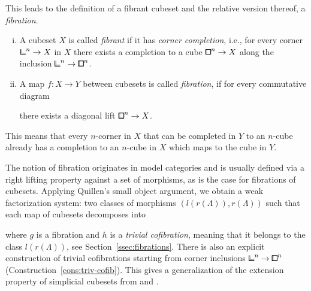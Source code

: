 This leads to the definition of a fibrant cubeset and the relative version thereof, a \emph{fibration}.

\begin{definition*}
    \begin{enumerate}[(i)]
        \item
A cubeset $X$ is called \emph{fibrant} if it has \emph{corner completion},
i.e., for every corner ${\bbcor}^n\to X$ in $X$ there exists a completion to a cube ${\bbox}^n\to X$
along the inclusion ${\bbcor}^n\to{\bbox}^n$.

        \item
A map $f\colon X\to Y$ between cubesets is called \emph{fibration},
if for every commutative diagram
\begin{center}
\end{center}
there exists a diagonal lift ${\bbox}^n\to X$.
        \end{enumerate}
\end{definition*}

This means that every $n$-corner in $X$ that can be completed in $Y$ to an $n$-cube already has a completion to an $n$-cube in $X$ which maps to the cube in $Y$.

The notion of fibration originates in model categories and is usually defined
via a right lifting property against a set of morphisms,
as is the case for fibrations of cubesets.
Applying Quillen's small object argument, we obtain a weak factorization system:
two classes of morphisms $(l(r(\Lambda)),r(\Lambda))$ such that each map of cubesets
decomposes into
\begin{center}
\end{center}
where $g$ is a fibration and $h$ is a \emph{trivial cofibration},
meaning that it belongs to the class $l(r(\Lambda))$, see Section~\ref{ssec:fibrations}.
There is also an explicit construction of trivial cofibrations
starting from corner inclusions ${\bbcor}^n\to{\bbox}^n$ (Construction~\ref{cons:triv-cofib}).
This gives a generalization of the extension property of simplicial cubesets from \cite[Lemma 3.1.5]{Candela2017} and \cite[Lemma 7.5]{Gutman2020}.

